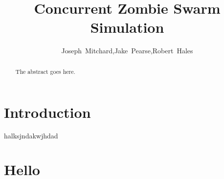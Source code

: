 \documentclass[conference]{IEEEtran}
\begin{document}
\title{Concurrent Zombie Swarm Simulation}
\author{Joseph~Mitchard,Jake~Pearse,Robert~Hales}

\begin{abstract}
The abstract goes here.
\end{abstract}
\maketitle

\section{Introduction}
\label{introduction}
halksjndakwjhdad

\section{Hello}
\end{document}
